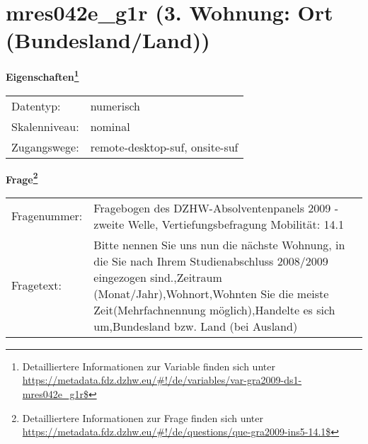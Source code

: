 
    \setcounter{footnote}{0}

    \vspace*{-1.8cm}
	\section{mres042e\_g1r (3. Wohnung: Ort (Bundesland/Land))}
	\label{section:mres042e_g1r}



    \vspace*{0.5cm}
    \noindent\textbf{Eigenschaften\footnote{Detailliertere Informationen zur Variable finden sich unter
		\url{https://metadata.fdz.dzhw.eu/\#!/de/variables/var-gra2009-ds1-mres042e_g1r$}}}\\
	\begin{tabularx}{\hsize}{@{}lX}
	Datentyp: & numerisch \\
	Skalenniveau: & nominal \\
	Zugangswege: &
	  remote-desktop-suf, 
	  onsite-suf
 \\
    \end{tabularx}



				\vspace*{0.5cm}
                \noindent\textbf{Frage\footnote{Detailliertere Informationen zur Frage finden sich unter
		              \url{https://metadata.fdz.dzhw.eu/\#!/de/questions/que-gra2009-ins5-14.1$}}}\\
				\begin{tabularx}{\hsize}{@{}lX}
					Fragenummer: &
					  Fragebogen des DZHW-Absolventenpanels 2009 - zweite Welle, Vertiefungsbefragung Mobilität:
					  14.1
 \\
					Fragetext: & Bitte nennen Sie uns nun die nächste Wohnung, in die Sie nach Ihrem Studienabschluss 2008/2009 eingezogen sind.,Zeitraum (Monat/Jahr),Wohnort,Wohnten Sie die meiste Zeit(Mehrfachnennung möglich),Handelte es sich um,Bundesland bzw. Land (bei Ausland) \\
				\end{tabularx}






